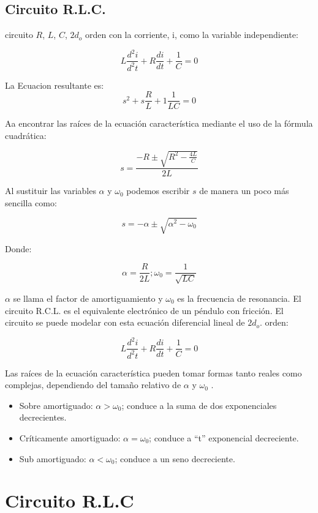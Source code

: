 \begin{multicols}{2}
	\subsection{Circuito R.L.C.}

		circuito $R$, $L$, $C$, $2d_o$ orden con la corriente, i, como la variable independiente:

		$$L \frac{d^2i}{d^2t} + R\frac{di}{dt} + \frac{1}{C} = 0$$

		La Ecuacion resultante es: \\

		$$s^2 + s\frac{R}{L} + 1\frac{1}{LC} = 0$$

		Aa encontrar las raíces de la ecuación característica mediante el uso de la fórmula cuadrática:
		
		$$s = \frac{-R\pm \sqrt{R^2-\frac{4L}{C}} }{2L}$$

		Al sustituir las variables $\alpha$ y $\omega _0$ podemos escribir $s$ de manera un poco más sencilla como:

		$$s = - \alpha \pm \sqrt{\alpha^2 - \omega _0}$$

		Donde:

		$$\alpha = \frac{R}{2L} ; \omega _0 = \frac{1}{\sqrt{LC}}$$

		$\alpha$ se llama el factor de amortiguamiento y $\omega _0$ es la frecuencia de resonancia.
		El circuito R.C.L. es el equivalente electrónico de un péndulo con fricción. El circuito se puede modelar con esta ecuación diferencial lineal de $2d_o$. orden:

		$$L \frac{d^2i}{d^2t} + R\frac{di}{dt} + \frac{1}{C} = 0$$

		Las raíces de la ecuación característica pueden tomar formas tanto reales como complejas, dependiendo del tamaño relativo de $\alpha$ y $\omega _0$ .


		\begin{itemize}
			\item Sobre amortiguado: $\alpha > \omega _0$; conduce a la suma de dos exponenciales decrecientes.
			\item Críticamente amortiguado:  $\alpha = \omega _0$; conduce a “t” exponencial decreciente.
			\item Sub amortiguado:  $\alpha < \omega _0$; conduce a un seno decreciente.
		\end{itemize}

\section{Circuito R.L.C}


\end{multicols}
